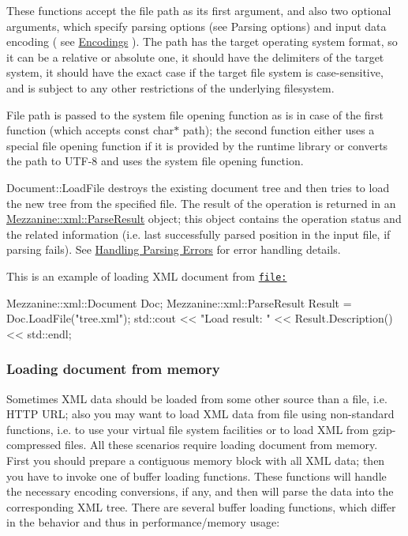  These functions accept the file path as its first argument, and also two optional arguments, which specify parsing options (see Parsing options) and input data encoding ( see \hyperlink{XMLManual_XMLLoadingEncodings}{Encodings} ). The path has the target operating system format, so it can be a relative or absolute one, it should have the delimiters of the target system, it should have the exact case if the target file system is case-\/sensitive, and is subject to any other restrictions of the underlying filesystem. \par
 \par
 File path is passed to the system file opening function as is in case of the first function (which accepts const char$\ast$ path); the second function either uses a special file opening function if it is provided by the runtime library or converts the path to UTF-\/8 and uses the system file opening function. \par
 \par
 Document::LoadFile destroys the existing document tree and then tries to load the new tree from the specified file. The result of the operation is returned in an \hyperlink{structMezzanine_1_1xml_1_1ParseResult}{Mezzanine::xml::ParseResult} object; this object contains the operation status and the related information (i.e. last successfully parsed position in the input file, if parsing fails). See \hyperlink{XMLManual_XMLLoadingErrors}{Handling Parsing Errors} for error handling details. \par
 \par
 This is an example of loading XML document from \href{file:}{\tt file:} 
\begin{DoxyCode}
 Mezzanine::xml::Document Doc;
 Mezzanine::xml::ParseResult Result = Doc.LoadFile("tree.xml");
 std::cout << "Load result: " << Result.Description() << std::endl;
\end{DoxyCode}
 \hypertarget{XMLManual_XMLLoadingFromMemory}{}\subsubsection{Loading document from memory}\label{XMLManual_XMLLoadingFromMemory}
Sometimes XML data should be loaded from some other source than a file, i.e. HTTP URL; also you may want to load XML data from file using non-\/standard functions, i.e. to use your virtual file system facilities or to load XML from gzip-\/compressed files. All these scenarios require loading document from memory. First you should prepare a contiguous memory block with all XML data; then you have to invoke one of buffer loading functions. These functions will handle the necessary encoding conversions, if any, and then will parse the data into the corresponding XML tree. There are several buffer loading functions, which differ in the behavior and thus in performance/memory usage: 
